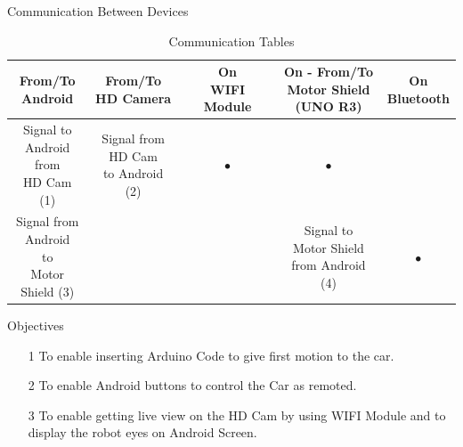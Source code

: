 \documentclass[xcolor=table, 9pt]{beamer}
\begin{document}
\begin{frame}{Communication Between Devices}
\begin{table}
\begin{tabular}{ |c| c | c | c | c |}
\hline
\thead{From/To \\ Android} & \thead{From/To \\ HD Camera} & \thead{On \\ WIFI Module} & \thead{On - From/To \\ Motor Shield \\ (UNO R3)} & \thead{On \\ Bluetooth}\\ \hline

\makecell{Signal to \\ Android \\ from \\HD Cam (1)} &  \makecell{Signal from \\ HD Cam \\ to Android (2)}  & \color{mavi}\Huge $\bullet$ & \color{mavi}\Huge $\bullet$ &   \\ \hline

\makecell{Signal from \\ Android \\ to\\ Motor \\Shield (3)} &    &  & \makecell{Signal to \\Motor Shield \\ from Android (4)} & \color{mavi}\Huge $\bullet$   \\ \hline
\end{tabular}
\caption{Communication Tables}
\end{table}
\end{frame}


	

\begin{frame}{Objectives}
\begin{itemize}
\item[1] To enable inserting Arduino Code to give first motion to the car.
\item[2] To enable Android buttons to control the Car as remoted.
\item[3] To enable getting live view on the HD Cam by using WIFI Module and to display the robot eyes on Android Screen.
\end{itemize}
\end{frame}


\end{document}
